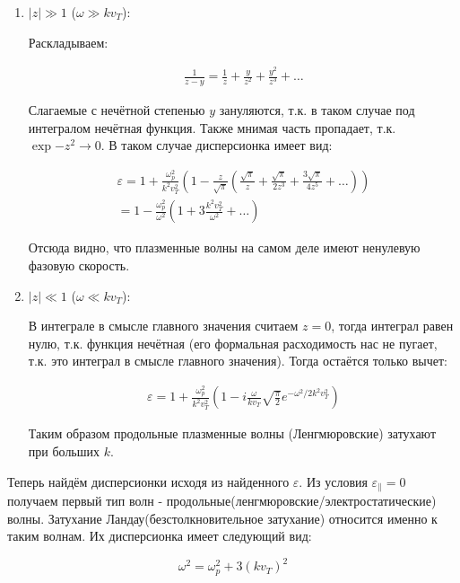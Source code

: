 \documentclass[10pt, a4paper]{article}
\begin{document}
\begin{enumerate}
	\item $|z| \gg 1$ ($\omega \gg kv_T$):
	
	Раскладываем:
	
	\begin{align*}
		\frac{1}{z-y} = \frac{1}{z} + \frac{y}{z^2} + \frac{y^2}{z^3} + \dots
	\end{align*}

	Слагаемые с нечётной степенью $y$ зануляются, т.к. в таком случае под интегралом нечётная функция. Также мнимая часть пропадает, т.к. $\exp{-z^2}\rightarrow 0$. В таком случае дисперсионка имеет вид:
	
	\begin{align*}
		\varepsilon = 1 + \frac{\omega_p^2}{k^2 v_T^2} \left( 1 - \frac{z}{\sqrt{\pi}}\left( \frac{\sqrt{\pi}}{z} + \frac{\sqrt{\pi}}{2z^3} + \frac{3\sqrt{\pi}}{4z^5} + \dots \right) \right) \\
		=1 - \frac{\omega_p^2}{\omega^2}\left( 1 + 3\frac{k^2 v_T^2}{\omega^2} + \dots \right)
	\end{align*}

	Отсюда видно, что плазменные волны на самом деле имеют ненулевую фазовую скорость.
	
	\item $|z| \ll 1$ ($\omega \ll kv_T$):
	
	В интеграле в смысле главного значения считаем $z=0$, тогда интеграл равен нулю, т.к. функция нечётная (его формальная расходимость нас не пугает, т.к. это интеграл в смысле главного значения). Тогда остаётся только вычет:
	
	\begin{align*}
		\varepsilon = 1 + \frac{\omega_p^2}{k^2 v_T^2} \left( 1 - i \frac{\omega}{k v_T}\sqrt{\frac{\pi}{2}}e^{-\omega^2/2k^2v_T^2} \right)
	\end{align*}

	Таким образом продольные плазменные волны (Ленгмюровские) затухают при больших $k$.
	
\end{enumerate}

Теперь найдём дисперсионки исходя из найденного $\varepsilon$. Из условия $\varepsilon_{\parallel} = 0$ получаем первый тип волн - продольные(ленгмюровские/электростатические) 
волны. Затухание Ландау(безстолкновительное затухание) относится именно к таким волнам. Их дисперсионка имеет следующий
вид:

\begin{equation}
    \omega^2=\omega_p^2 + 3 (k v_{T})^2
\end{equation}
\end{document}
